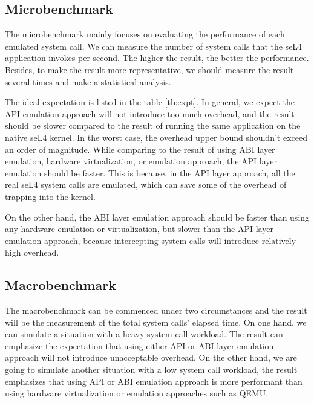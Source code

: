 \subsection{Microbenchmark}

The microbenchmark mainly focuses on evaluating the performance of each emulated system call. We can measure the number of system calls that the seL4 application invokes per second. The higher the result, the better the performance. Besides, to make the result more representative, we should measure the result several times and make a statistical analysis.

The ideal expectation is listed in the table \ref{tb:expt}. In general, we expect the API emulation approach will not introduce too much overhead, and the result should be slower compared to the result of running the same application on the native seL4 kernel. In the worst case, the overhead upper bound shouldn't exceed an order of magnitude. While comparing to the result of using ABI layer emulation, hardware virtualization, or emulation approach, the API layer emulation should be faster. This is because, in the API layer approach, all the real seL4 system calls are emulated, which can save some of the overhead of trapping into the kernel.  

On the other hand, the ABI layer emulation approach should be faster than using any hardware emulation or virtualization, but slower than the API layer emulation approach, because intercepting system calls will introduce relatively high overhead.   

\subsection{Macrobenchmark}

The macrobenchmark can be commenced under two circumstances and the result will be the measurement of the total system calls' elapsed time. On one hand, we can simulate a situation with a heavy system call workload. The result can emphasize the expectation that using either API or ABI layer emulation approach will not introduce unacceptable overhead. On the other hand, we are going to simulate another situation with a low system call workload, the result emphasizes that using API or ABI emulation approach is more performant than using hardware virtualization or emulation approaches such as QEMU.